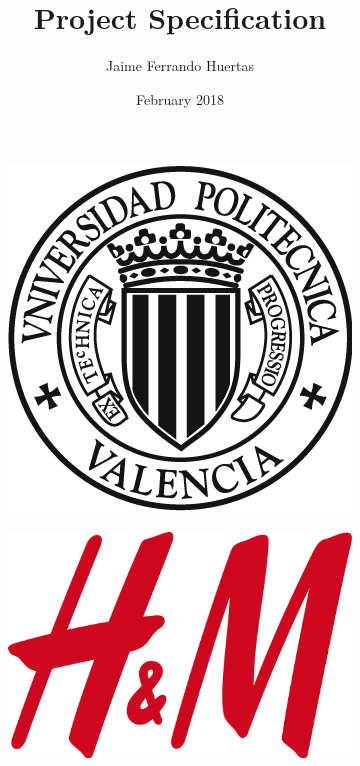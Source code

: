 \documentclass{kththesis}
\title{Project Specification}
\author{Jaime Ferrando Huertas }
\date{February 2018}
\begin{document}
\begin{titlepage}
 

\end{titlepage}

\begin{titlepage}
    \begin{center}
        \begin{figure}
            \centering
            \begin{subfigure}{.5\textwidth}
              \centering
              \includegraphics[width=.7\linewidth]{logoUPV3.jpg}
            \end{subfigure}%
            \begin{subfigure}{.5\textwidth}
              \centering
              \includegraphics[width=.7\linewidth]{2560px-H&M-Logo.svg.png}

            \end{subfigure}

        \end{figure}
        
        \vspace*{1cm}
        

\end{center}
\end{titlepage}
\end{document}
